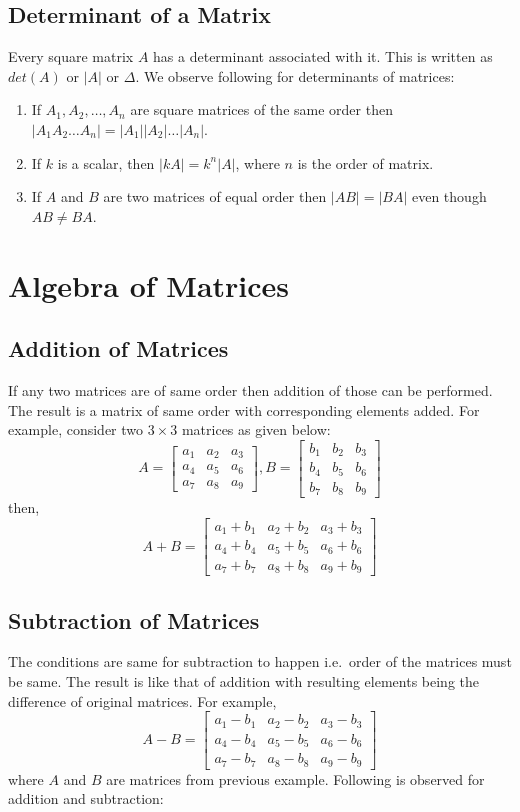 \subsection{Determinant of a Matrix}
Every square matrix $A$ has a determinant associated with it. This is written as $det(A)$ or $|A|$ or $\Delta$. We observe
following for determinants of matrices:

\begin{enumerate}
\item  If $A_1, A_2, \ldots, A_n$ are square matrices of the same order then $|A_1A_2\ldots A_n| = |A_1||A_2|\ldots|A_n|$.
\item If $k$ is a scalar, then $|kA| = k^n|A|$, where $n$ is the   order of matrix.
\item If $A$ and $B$ are two matrices of equal order then $|AB| = |BA|$ even though $AB\neq BA$.
\end{enumerate}

\section{Algebra of Matrices}

\subsection{Addition of Matrices}
If any two matrices are of same order then addition of those can be performed. The result is a matrix of same order with
corresponding elements added. For example, consider two $3\times 3$ matrices as given below:
\[A = \begin{bmatrix}a_1 & a_2 & a_3\\a_4 & a_5 & a_6\\a_7 & a_8 &
a_9\end{bmatrix}, B = \begin{bmatrix}b_1 & b_2 & b_3\\b_4 & b_5 & b_6\\b_7 & b_8 &
b_9\end{bmatrix}\]
then,
\[A + B = \begin{bmatrix}a_1 + b_1 & a_2 + b_2 & a_3 + b_3\\a_4 + b_4 &
a_5 + b_5 & a_6 + b_6\\a_7 + b_7 & a_8 + b_8 & a_9 + b_9\end{bmatrix}\]

\subsection{Subtraction of Matrices}
The conditions are same for subtraction to happen i.e.\ order of the matrices must be same. The result is like that of addition
with resulting elements being the difference of original matrices. For example,
\[A - B = \begin{bmatrix}a_1 - b_1 & a_2 - b_2 & a_3 - b_3\\a_4 - b_4 &
a_5 - b_5 & a_6 - b_6\\a_7 - b_7 & a_8 - b_8 & a_9 - b_9\end{bmatrix}\]
where $A$ and $B$ are matrices from previous example. Following is observed for addition and subtraction:

